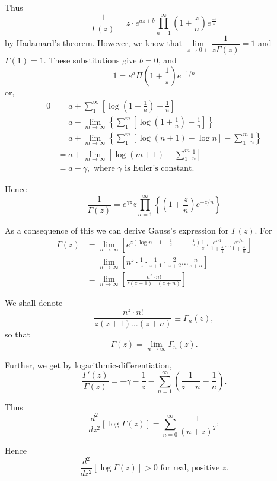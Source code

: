 Thus 
$$
\frac{1}{\Gamma(z)} = z\cdot e^{az+b} \prod\limits^{\infty}_{n=1}
\left(1+\frac{z}{n}\right) e^{\frac{-z}{n}}
$$
by Hadamard's theorem. However, we know that $\lim\limits_{z\to 0+}
\dfrac{1}{z\Gamma (z)} =1$ and $\Gamma(1)=1$. These substitutions give
$b=0$, and 
$$
1 = e^a \Pi \left(1+\frac{1}{\pi} \right) e^{-1/n}
$$
or,
\begin{align*}
0 &= a + \sum\limits^\infty_1 \left[\log \left(1+\frac{1}{n} \right)
  -\frac{1}{n} \right] \\
& = a - \lim\limits_{m \to \infty} \left\{\sum\limits^m_{1} \left[\log
\left(1+\frac{1}{n} \right) - \frac{1}{n} \right] \right\} \\
& = a + \lim\limits_{m \to \infty} \left\{ \sum\limits^m_1 \left[\log
  (n+1) - \log n \right] - \sum\limits^m_1 \frac{1}{n}\right\}\\
& = a + \lim\limits_{m\to\infty} \left[\log(m+1) - \sum\limits^m_1
  \frac{1}{n} \right] \\
& = a - \gamma, \text{ where $\gamma$ is Euler's constant.}
\end{align*}\pageoriginale 

Hence
$$
\frac{1}{\Gamma (z)} = e^{\gamma z} z \prod\limits^\infty_{n=1}
\left\{\left(1+\frac{z}{n} \right)e^{-z/n} \right\}
$$

As a consequence of this we can derive Gauss's expression for
$\Gamma(z)$. For 
\begin{align*}
\Gamma(z) & = \lim\limits_{n\to\infty} \left[ e^{z(\log n -1 -
    \frac{1}{2} - \ldots -\frac{1}{n})} \frac{1}{z} \cdot
  \frac{e^{z/1}}{1+\frac{z}{1}} \ldots \frac{e^{z/n}}{1+\frac{z}{n}}
\right]\\
& = \lim\limits_{n \to \infty} \left[n^z \cdot \frac{1}{z} \cdot
  \frac{1}{z+1} \cdot \frac{2}{z+2} \ldots \frac{n}{z+n} \right]\\
& = \lim\limits_{n\to\infty} \left[\frac{n^z \cdot n!}{z(z+1) \ldots
    (z+n)} \right] 
\end{align*}

We shall denote
$$
\frac{n^z \cdot n!}{z(z+1) \ldots (z+n)} \equiv \Gamma_n(z),
$$
so that\pageoriginale
$$
\Gamma (z) = \lim\limits_{n \to \infty} \Gamma_n (z).
$$

Further, we get by logarithmic-differentiation,
$$ 
\frac{\Gamma' (z)}{\Gamma(z)} = -\gamma - \frac{1}{z} -
\sum\limits^\infty_{n=1} \left(\frac{1}{z+n} -\frac{1}{n} \right).
$$

Thus
$$
\frac{d^2}{dz^2} [\log \Gamma (z)] = \sum\limits^\infty_{n=0}
\frac{1}{(n+z)^2}; 
$$

Hence
$$
\frac{d^2}{dz^2} [\log \Gamma (z)] > 0 \text{ for real, positive $z$.}
$$
